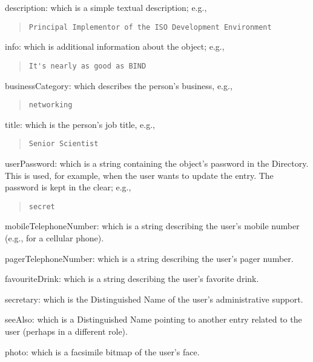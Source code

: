 \begin{describe}
\item[description:]
			which is a simple textual description;
			e.g.,
\begin{quote}\small\begin{verbatim}
Principal Implementor of the ISO Development Environment
\end{verbatim}\end{quote}

\item[info:]
			which is additional information about the object;
			e.g.,
\begin{quote}\small\begin{verbatim}
It's nearly as good as BIND
\end{verbatim}\end{quote}

\item[businessCategory:]
			which describes the person's business,
			e.g.,
\begin{quote}\small\begin{verbatim}
networking
\end{verbatim}\end{quote}

\item[title:]
			which is the person's job title,
			e.g.,
\begin{quote}\small\begin{verbatim}
Senior Scientist
\end{verbatim}\end{quote}

\item[userPassword:]
			which is a string containing the object's
			password in the Directory.  This is used,
			for example, when the user wants to update
			the entry.
			The password is kept in the clear; e.g.,
\begin{quote}\small\begin{verbatim}
secret
\end{verbatim}\end{quote}

\item[mobileTelephoneNumber:]
			which is a string describing the user's mobile
			number (e.g., for a cellular phone).

\item[pagerTelephoneNumber:]
			which is a string describing the user's pager number.

\item[favouriteDrink:]
			which is a string describing the user's favorite drink.

\item[secretary:]
			which is the Distinguished Name of the user's
			administrative support.

\item[seeAlso:]
			which is a Distinguished Name pointing to another
			entry related to the user (perhaps in a different
			role).

\item[photo:]
			which is a facsimile bitmap of the user's face.
\end{describe}
